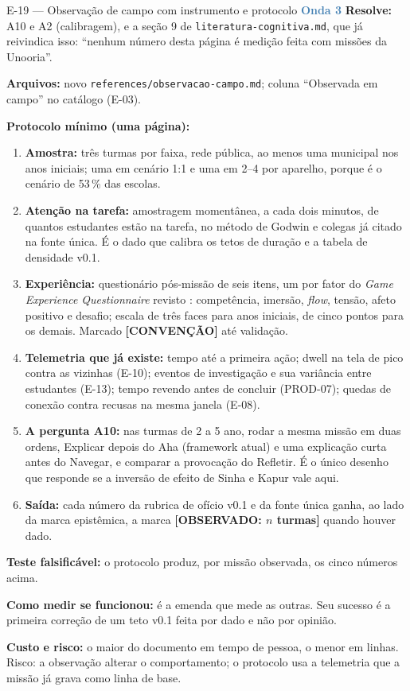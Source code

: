 \documentclass[11pt,a4paper]{article}
\newcommand{\onda}[1]{\textcolor{SteelBlue}{\textbf{Onda #1}}}
\newcommand{\conv}{\textbf{[CONVENÇÃO]}}
\begin{document}
\begin{emendabox}{E-19 --- Observação de campo com instrumento e protocolo \hfill \onda{3}}
\textbf{Resolve:} A10 e A2 (calibragem), e a seção 9 de \texttt{literatura-cognitiva.md}, que já
reivindica isso: ``nenhum número desta página é medição feita com missões da Unooria''.

\textbf{Arquivos:} novo \texttt{references/observacao-campo.md}; coluna ``Observada em campo'' no
catálogo (E-03).

\textbf{Protocolo mínimo (uma página):}
\begin{enumerate}
  \item \textbf{Amostra:} três turmas por faixa, rede pública, ao menos uma municipal nos anos
        iniciais; uma em cenário 1:1 e uma em 2--4 por aparelho, porque é o cenário de 53\,\% das
        escolas.
  \item \textbf{Atenção na tarefa:} amostragem momentânea, a cada dois minutos, de quantos
        estudantes estão na tarefa, no método de Godwin e colegas já citado na fonte única. É o
        dado que calibra os tetos de duração e a tabela de densidade v0.1.
  \item \textbf{Experiência:} questionário pós-missão de seis itens, um por fator do
        \emph{Game Experience Questionnaire} revisto \cite{law2018}: competência, imersão,
        \emph{flow}, tensão, afeto positivo e desafio; escala de três faces para anos iniciais,
        de cinco pontos para os demais. Marcado \conv{} até validação.
  \item \textbf{Telemetria que já existe:} tempo até a primeira ação; dwell na tela de pico contra
        as vizinhas (E-10); eventos de investigação e sua variância entre estudantes (E-13); tempo
        revendo antes de concluir (PROD-07); quedas de conexão contra recusas na mesma janela
        (E-08).
  \item \textbf{A pergunta A10:} nas turmas de 2\textordmasculine{} a 5\textordmasculine{} ano,
        rodar a mesma missão em duas ordens, Explicar depois do Aha (framework atual) e uma
        explicação curta antes do Navegar, e comparar a provocação do Refletir. É o único desenho
        que responde se a inversão de efeito de Sinha e Kapur \cite{sinha2021} vale aqui.
  \item \textbf{Saída:} cada número da rubrica de ofício v0.1 e da fonte única ganha, ao lado da
        marca epistêmica, a marca \textbf{[OBSERVADO: $n$ turmas]} quando houver dado.
\end{enumerate}

\textbf{Teste falsificável:} o protocolo produz, por missão observada, os cinco números acima.

\textbf{Como medir se funcionou:} é a emenda que mede as outras. Seu sucesso é a primeira
correção de um teto v0.1 feita por dado e não por opinião.

\textbf{Custo e risco:} o maior do documento em tempo de pessoa, o menor em linhas. Risco: a
observação alterar o comportamento; o protocolo usa a telemetria que a missão já grava como linha
de base.
\end{emendabox}
\end{document}
